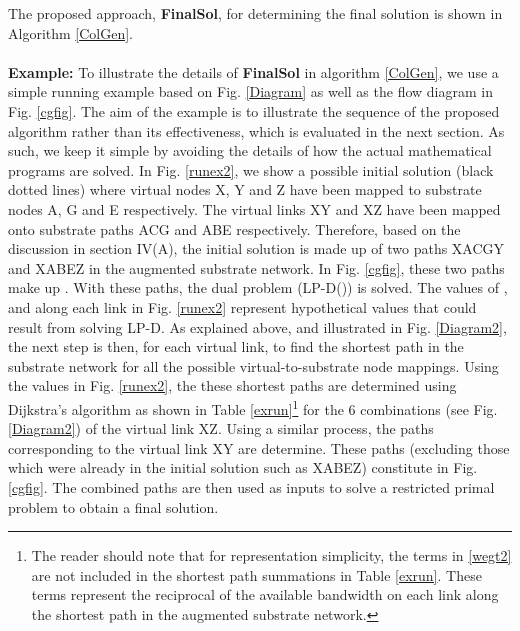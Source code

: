 \documentclass[journal]{IEEEtran}
\begin{document}
The proposed approach, \textbf{FinalSol}, for determining the final solution is shown in Algorithm \ref{ColGen}.\\\\
\noindent \textbf{Example:} To illustrate the details of \textbf{FinalSol} in algorithm \ref{ColGen}, we use a simple running example based on Fig. \ref{Diagram} as well as the flow diagram in Fig. \ref{cgfig}. The aim of the example is to illustrate the sequence of the proposed algorithm rather than its effectiveness, which is evaluated in the next section. As such, we keep it simple by avoiding the details of how the actual mathematical programs are solved. In Fig. \ref{runex2}, we show a possible initial solution (black dotted lines) where virtual nodes X, Y and Z have been mapped to substrate nodes A, G and E respectively. The virtual links XY and XZ have been mapped onto substrate paths ACG and ABE respectively. Therefore, based on the discussion in section IV(A), the initial solution is made up of two paths XACGY and XABEZ in the augmented substrate network. In Fig. \ref{cgfig}, these two paths make up . With these paths, the dual problem (LP-D()) is solved. The values of ,  and  along each link in Fig. \ref{runex2} represent hypothetical values that could result from solving LP-D. As explained above, and illustrated in Fig. \ref{Diagram2}, the next step is then, for each virtual link, to find the shortest path in the substrate network for all the possible virtual-to-substrate node mappings. Using the values in Fig. \ref{runex2}, the these shortest paths are determined using Dijkstra's algorithm as shown in Table \ref{exrun}\footnote{The reader should note that for representation simplicity, the terms  in \eqref{wegt2} are not included in the shortest path summations in Table \ref{exrun}. These terms represent the reciprocal of the available bandwidth on each link along the shortest path in the augmented substrate network.} for the 6 combinations (see Fig. \ref{Diagram2}) of the virtual link XZ. Using a similar process, the paths corresponding to the virtual link XY are determine. These paths (excluding those which were already in the initial solution such as XABEZ) constitute  in Fig. \ref{cgfig}.  The combined paths  are then used as inputs to solve a restricted primal problem to obtain a final solution.
\end{document}
